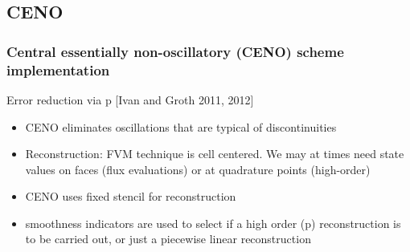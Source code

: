\documentclass{beamer}
\begin{document}

\subsection{CENO}
\begin{frame}
\scriptsize
\frametitle{Central essentially non-oscillatory (CENO) scheme implementation} 

\begin{minipage}[t][1\textheight]{1\textwidth}
\vspace{-20pt}
\begin{exampleblock}{Error reduction via p}
\tiny
[Ivan and Groth 2011, 2012]
\begin{itemize}
\item CENO eliminates oscillations that are typical of discontinuities
\item Reconstruction: FVM technique is cell centered. We may at times need state values on faces (flux evaluations) or at quadrature points (high-order)
\item CENO uses fixed stencil for reconstruction
\item smoothness indicators are used to select if a high order (p) reconstruction is to be carried out, or just a piecewise linear reconstruction
\end{itemize}
\vspace{-20pt}
\tiny
\begin{figure}
\label{fig:h_order_error}
\centering
{}

\end{figure}
\end{exampleblock}
\end{minipage}
\end{frame}
\end{document}
